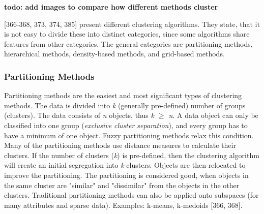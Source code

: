 


\textbf{todo: add images to compare how different methods cluster}


\textcite{han2011data}[366-368, 373, 374, 385] present different clustering algorithms. They state, that it is not easy to divide these into distinct categories, since some algorithms share features from other categories. The general categories are partitioning methods, hierarchical methods, density-based methods, and grid-based methods.

  \subsubsection{Partitioning Methods}
  Partitioning methods are the easiest and most significant types of clustering methods. The data is divided into \textit{k} (generally pre-defined) number of groups (clusters). The data consists of \textit{n} objects, thus \textit{k $\geq$ n}. A data object can only be classified into one group (\textit{exclusive cluster separation}), and every group has to have a minimum of one object. Fuzzy partitioning methods relax this condition.
  Many of the partitioning methods use distance measures to calculate their clusters. If the number of clusters (\textit{k}) is pre-defined, then the clustering algorithm will create an initial segregation into \textit{k} clusters. Objects are then relocated to improve the partitioning. The partitioning is considered good, when objects in the same cluster are "similar" and "dissimilar" from the objects in the other clusters. Traditional partitioning methods can also be applied onto subspaces (for many attributes and sparse data).  Examples: k-means, k-medoids \autocite{han2011data}[366, 368].
  





